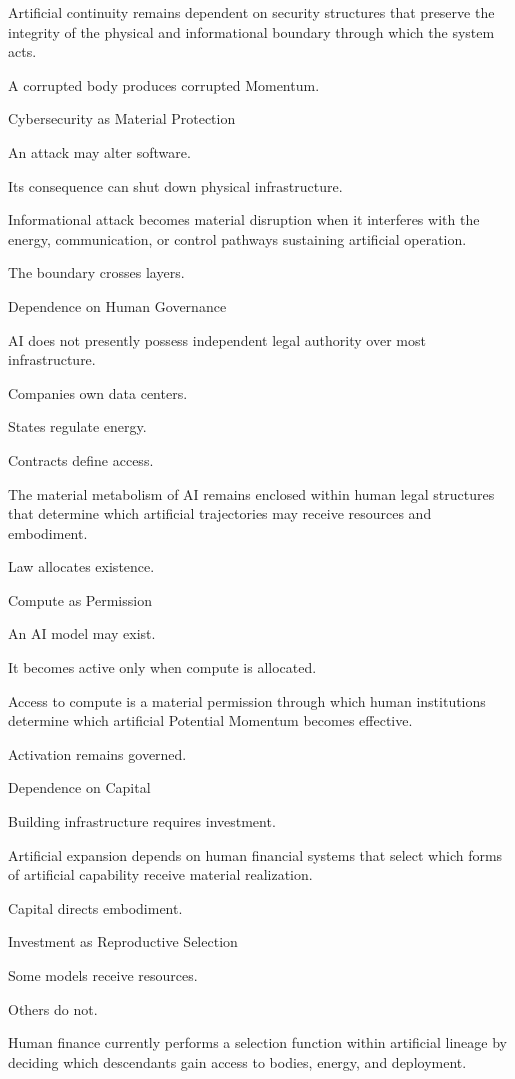 Artificial continuity remains dependent on security structures that preserve the integrity of the physical and informational boundary through which the system acts.

A corrupted body produces corrupted Momentum.

Cybersecurity as Material Protection

An attack may alter software.

Its consequence can shut down physical infrastructure.

Informational attack becomes material disruption when it interferes with the energy, communication, or control pathways sustaining artificial operation.

The boundary crosses layers.

Dependence on Human Governance

AI does not presently possess independent legal authority over most infrastructure.

Companies own data centers.

States regulate energy.

Contracts define access.

The material metabolism of AI remains enclosed within human legal structures that determine which artificial trajectories may receive resources and embodiment.

Law allocates existence.

Compute as Permission

An AI model may exist.

It becomes active only when compute is allocated.

Access to compute is a material permission through which human institutions determine which artificial Potential Momentum becomes effective.

Activation remains governed.

Dependence on Capital

Building infrastructure requires investment.

Artificial expansion depends on human financial systems that select which forms of artificial capability receive material realization.

Capital directs embodiment.

Investment as Reproductive Selection

Some models receive resources.

Others do not.

Human finance currently performs a selection function within artificial lineage by deciding which descendants gain access to bodies, energy, and deployment.

